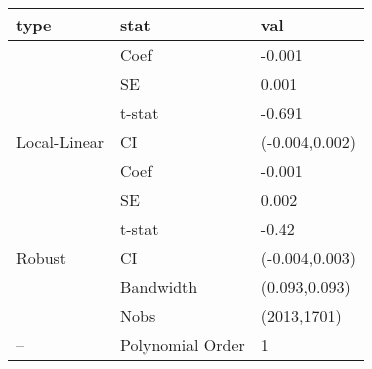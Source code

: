 
\begin{tabular}{lll}
\toprule
type & stat & val\\
\midrule
 & Coef & -0.001\\

 & SE & 0.001\\

 & t-stat & -0.691\\

\multirow{-4}{*}{\raggedright\arraybackslash Local-Linear} & CI & (-0.004,0.002)\\
\cmidrule{1-3}
 & Coef & -0.001\\

 & SE & 0.002\\

 & t-stat & -0.42\\

\multirow{-4}{*}{\raggedright\arraybackslash Robust} & CI & (-0.004,0.003)\\
\cmidrule{1-3}
 & Bandwidth & (0.093,0.093)\\

 & Nobs & (2013,1701)\\

\multirow{-3}{*}{\raggedright\arraybackslash --} & Polynomial Order & 1\\
\bottomrule
\end{tabular}